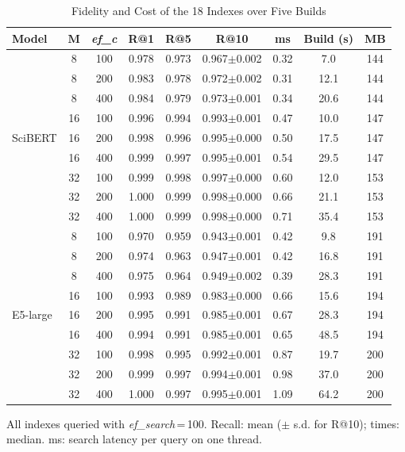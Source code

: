 \documentclass[conference, letterpaper]{IEEEtran}
\begin{document}
\begin{table}[!tb]
\centering
\begin{threeparttable}
\caption{Fidelity and Cost of the 18 Indexes over Five Builds}
\label{tab:configs}
\footnotesize
\setlength{\tabcolsep}{3.2pt}
\begin{tabular}{@{}lcccccccc@{}}
\toprule
\textbf{Model} & $\boldsymbol{M}$ & \textbf{\textit{ef\_c}} & \textbf{R@1} & \textbf{R@5} & \textbf{R@10} & \textbf{ms} & \textbf{Build (s)} & \textbf{MB} \\
\midrule
\multirow{9}{*}{SciBERT}
 & 8 & 100 & 0.978 & 0.973 & 0.967$\pm$0.002 & 0.32 & 7.0 & 144 \\
 & 8 & 200 & 0.983 & 0.978 & 0.972$\pm$0.002 & 0.31 & 12.1 & 144 \\
 & 8 & 400 & 0.984 & 0.979 & 0.973$\pm$0.001 & 0.34 & 20.6 & 144 \\
 & 16 & 100 & 0.996 & 0.994 & 0.993$\pm$0.001 & 0.47 & 10.0 & 147 \\
 & 16 & 200 & 0.998 & 0.996 & 0.995$\pm$0.000 & 0.50 & 17.5 & 147 \\
 & 16 & 400 & 0.999 & 0.997 & 0.995$\pm$0.001 & 0.54 & 29.5 & 147 \\
 & 32 & 100 & 0.999 & 0.998 & 0.997$\pm$0.000 & 0.60 & 12.0 & 153 \\
 & 32 & 200 & 1.000 & 0.999 & 0.998$\pm$0.000 & 0.66 & 21.1 & 153 \\
 & 32 & 400 & 1.000 & 0.999 & 0.998$\pm$0.000 & 0.71 & 35.4 & 153 \\
\midrule
\multirow{9}{*}{E5-large}
 & 8 & 100 & 0.970 & 0.959 & 0.943$\pm$0.001 & 0.42 & 9.8 & 191 \\
 & 8 & 200 & 0.974 & 0.963 & 0.947$\pm$0.001 & 0.42 & 16.8 & 191 \\
 & 8 & 400 & 0.975 & 0.964 & 0.949$\pm$0.002 & 0.39 & 28.3 & 191 \\
 & 16 & 100 & 0.993 & 0.989 & 0.983$\pm$0.000 & 0.66 & 15.6 & 194 \\
 & 16 & 200 & 0.995 & 0.991 & 0.985$\pm$0.001 & 0.67 & 28.3 & 194 \\
 & 16 & 400 & 0.994 & 0.991 & 0.985$\pm$0.001 & 0.65 & 48.5 & 194 \\
 & 32 & 100 & 0.998 & 0.995 & 0.992$\pm$0.001 & 0.87 & 19.7 & 200 \\
 & 32 & 200 & 0.999 & 0.997 & 0.994$\pm$0.001 & 0.98 & 37.0 & 200 \\
 & 32 & 400 & 1.000 & 0.997 & 0.995$\pm$0.001 & 1.09 & 64.2 & 200 \\
\bottomrule
\end{tabular}
\begin{tablenotes}
\scriptsize
\item All indexes queried with \textit{ef\_search}\,=\,100. Recall: mean ($\pm$ s.d. for R@10); times: median. ms: search latency per query on one thread.
\end{tablenotes}
\end{threeparttable}
\end{table}
\end{document}
